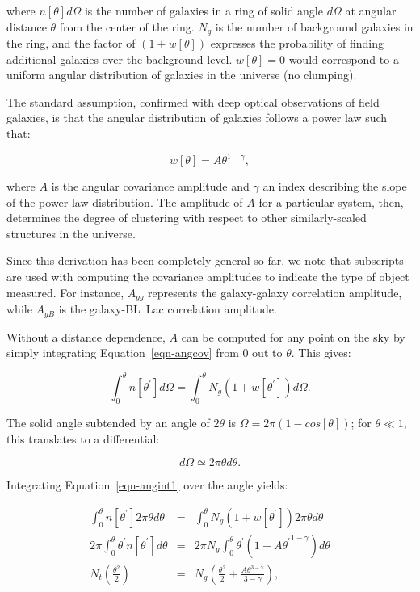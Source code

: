 \documentclass{emulateapj}
\begin{document}
\noindent where $n[\theta]d\Omega$ is the number of galaxies in a ring of solid angle $d\Omega$ at angular distance $\theta$ from the center of the ring. $N_g$ is the number of background galaxies in the ring, and the factor of $(1+w[\theta])$ expresses the probability of finding additional galaxies over the background level. $w[\theta]=0$ would correspond to a uniform angular distribution of galaxies in the universe (no clumping). 

The standard assumption, confirmed with deep optical observations of field galaxies, is that the angular distribution of galaxies follows a power law such that:

\begin{equation}
\label{eqn-wtheta}
w[\theta] = A\theta^{1-\gamma},
\end{equation}

\noindent where $A$ is the angular covariance amplitude and $\gamma$ an index describing the slope of the power-law distribution. The amplitude of $A$ for a particular system, then, determines the degree of clustering with respect to other similarly-scaled structures in the universe. 

Since this derivation has been completely general so far, we note that subscripts are used with computing the covariance amplitudes to indicate the type of object measured. For instance, $A_{gg}$ represents the galaxy-galaxy correlation amplitude, while $A_{gB}$ is the galaxy-BL~Lac correlation amplitude. 

Without a distance dependence, $A$ can be computed for any point on the sky by simply integrating Equation~\ref{eqn-angcov} from 0 out to $\theta$. This gives:

\begin{equation}
\label{eqn-angint1}
\int^\theta_0 n[\theta^\prime]d\Omega = \int^\theta_0 N_g (1 + w[\theta^\prime]) d\Omega.
\end{equation}

\noindent The solid angle subtended by an angle of $2\theta$ is $\Omega=2\pi(1-cos[\theta])$; for $\theta\ll1$, this translates to a differential:

\begin{equation}
d\Omega \simeq 2\pi \theta d\theta.
\end{equation}

\noindent Integrating Equation~\ref{eqn-angint1} over the angle yields:

\begin{eqnarray}
\int^\theta_0 n[\theta^\prime] 2 \pi \theta d\theta & = & \int^\theta_0 N_g (1 + w[\theta^\prime]) 2 \pi \theta d\theta \\
2\pi \int^\theta_0 \theta^\prime n[\theta^\prime]d\theta & = & 2 \pi N_g \int^\theta_0 \theta^\prime (1 + A {\theta^\prime}^{1-\gamma}) d\theta \\
N_t \left(\frac{\theta^2}{2}\right) & = & N_g \left(\frac{\theta^2}{2} + \frac{A\theta^{3-\gamma}}{3-\gamma}\right),
\end{eqnarray}
\end{document}
